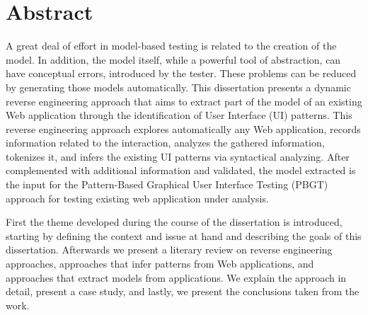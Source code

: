 \chapter*{Abstract}
A great deal of effort in model-based testing is related to the creation of the model. In addition, the model itself, while a powerful tool of abstraction, can have conceptual errors, introduced by the tester. These problems can be reduced by generating those models automatically. This dissertation presents a dynamic reverse engineering approach that aims to extract part of the model of an existing Web application through the identification of User Interface (UI) patterns. This reverse engineering approach explores automatically any Web application, records information related to the interaction, analyzes the gathered information, tokenizes it, and infers the existing UI patterns via syntactical analyzing. After complemented with additional information and validated, the model extracted is the input for the Pattern-Based Graphical User Interface Testing (PBGT) approach for testing existing web application under analysis.

First the theme developed during the course of the dissertation is introduced, starting by defining the context and issue at hand and describing the goals of this dissertation. Afterwards we present a literary review on reverse engineering approaches, approaches that infer patterns from Web applications, and approaches that extract models from applications. We explain the approach in detail, present a case study, and lastly, we present the conclusions taken from the work.

